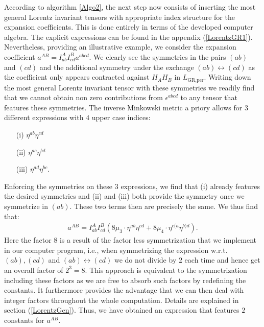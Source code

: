 According to algorithm \ref{Algo2}, the next step now consists of inserting the most general Lorentz invariant tensors with appropriate index structure for the expansion coefficients. This is done entirely in terms of the developed computer algebra. The explicit expressions can be found in the appendix (\ref{LorentzGR1}).
Nevertheless, providing an illustrative example, we consider the expansion coefficient $a^{AB} = I^{A}_{ab}I^{B}_{cd}a^{abcd}$. We clearly see the symmetries in the pairs $(ab)$ and $(cd)$ and the additional symmetry under the exchange $(ab) \leftrightarrow (cd)$ as the coefficient only appears contracted against $H_AH_B$ in $L_{\text{GR,per}}$. Writing down the most general Lorentz invariant tensor with these symmetries we readily find that we cannot obtain non zero contributions from $\epsilon^{abcd}$ to any tensor that features these symmetries. The inverse Minkowski metric a priory allows for $3$ different expressions with $4$ upper case indices:
\begin{itemize}
    \item[(i)] $\eta^{ab} \eta^{cd}$ 
    \item[(ii)] $\eta^{ac} \eta^{bd}$ 
    \item[(iii)] $\eta^{ad} \eta^{bc}$.
\end{itemize}
Enforcing the symmetries on these $3$ expressions, we find that (i) already features the desired symmetries and (ii) and (iii) both provide the symmetry once we symmetrize in $(ab)$. These two terms then are precisely the same. We thus find that:
\begin{align}\label{ansatzExample}
    a^{AB} = I^{A}_{ab}I^{B}_{cd} \left ( 8\mu_3 \cdot \eta^{ab}\eta^{cd} + 8\mu_4 \cdot \eta^{c(a} \eta^{b)d}   \right ).
\end{align}
Here the factor $8$ is a result of the factor less symmetrization that we implement in our computer program, i.e., when symmetrizing the expression w.r.t. $(ab),(cd)$ and $(ab) \leftrightarrow (cd) $ we do not divide by $2$ each time and hence get an overall factor of $2^3=8$. This approach is equivalent to the symmetrization including these factors as we are free to absorb such factors by redefining the constants. It furthermore provides the advantage that we can then deal with integer factors throughout the whole computation. Details are explained in section (\ref{LorentzGen}).
Thus, we have obtained an expression that features $2$ constants for $a^{AB}$.

